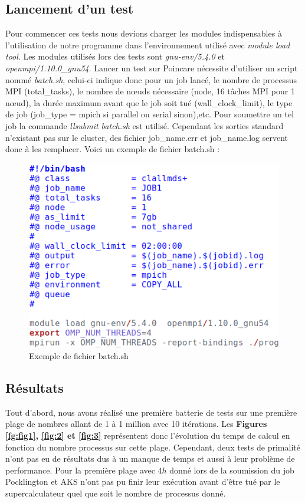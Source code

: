 		\subsection{Lancement d'un test}
Pour commencer ces tests nous devions charger les modules indispensables à l'utilisation de notre programme dans l’environnement utilisé avec  \textit{module load tool}. Les modules utilisés lors des tests sont \textit{gnu-env/5.4.0} et \textit{openmpi/1.10.0\_gnu54}. Lancer un test sur Poincare nécessite d'utiliser un script nommé \textit{batch.sh}, celui-ci indique donc pour un job lancé, le nombre de processus MPI (total\_tasks), le nombre de nœuds nécessaire (node, 16 tâches MPI pour 1 nœud), la durée maximum avant que le job soit tué (wall\_clock\_limit), le type de job (job\_type = mpich si parallel ou serial sinon),etc. Pour soumettre un tel job la commande \textit{llsubmit batch.sh} est utilisé. Cependant les sorties standard n'existant pas sur le cluster, des fichier job\_name.err et job\_name.log servent donc à les remplacer. Voici un exemple de fichier batch.sh :\\
	 \begin{figure}[!ht]	
		\begin{center}\includegraphics[scale=0.6]{batch.png}\end{center}
		\caption{Exemple de fichier batch.sh}
		\label{fg:bat}
\end{figure}
		\subsection{Résultats}
	
Tout d'abord, nous avons réalisé une première batterie de tests sur une première plage de nombres allant de 1 à 1 million avec 10 itérations. Les \textbf{Figures \ref{fg:fig1}, \ref{fig:2} et \ref{fig:3}} représentent donc l'évolution du temps de calcul en fonction du nombre processus sur cette plage. Cependant, deux tests de primalité n'ont pas eu de résultats dus à un manque de temps et aussi à leur problème de performance. Pour la première plage avec $4h$ donné lors de la soumission du job Pocklington et AKS n'ont pas pu finir leur exécution avant d'être tué par le supercalculateur quel que soit le nombre de processus donné. 
		
